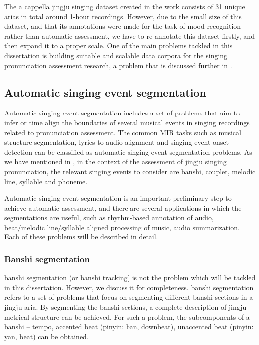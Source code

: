 The a cappella jingju singing dataset created in the work \cite{black_automatic_2014} consists of 31 unique arias in total around 1-hour recordings. However, due to the small size of this dataset, and that its annotations were made for the task of mood recognition rather than automatic assessment, we have to re-annotate this dataset firstly, and then expand it to a proper scale. One of the main problems tackled in this dissertation is building suitable and scalable data corpora for the singing pronunciation assessment research, a problem that is discussed further in . 

\subsection{Automatic singing event segmentation}

Automatic singing event segmentation includes a set of problems that aim to infer or time align the boundaries of several musical events in singing recordings related to pronunciation assessment. The common \gls{MIR} tasks such as musical structure segmentation, lyrics-to-audio alignment and singing event onset detection can be classified as automatic singing event segmentation problems. As we have mentioned in , in the context of the assessment of jingju singing pronunciation, the relevant singing events to consider are \gls{banshi}, couplet, melodic line, syllable and phoneme. 

Automatic singing event segmentation is an important preliminary step to achieve automatic assessment, and there are several applications in which the segmentations are useful, such as rhythm-based annotation of audio, beat/melodic line/syllable aligned processing of music, audio summarization. Each of these problems will be described in detail.

\subsubsection{Banshi segmentation}

\Gls{banshi} segmentation (or \gls{banshi} tracking) is not the problem which will be tackled in this dissertation. However, we discuss it for completeness. \Gls{banshi} segmentation refers to a set of problems that focus on segmenting different \gls{banshi} sections in a jingju aria. By segmenting the \gls{banshi} sections, a complete description of jingju metrical structure can be achieved. For such a problem, the subcomponents of a \gls{banshi} -- tempo, accented beat (pinyin: ban, downbeat), unaccented beat (pinyin: yan, beat) can be obtained.

